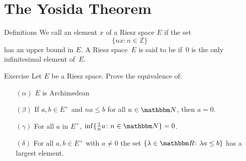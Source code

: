 \documentclass[main.tex]{subfiles}
\begin{document}
\section{The Yosida Theorem}
%
%
\begin{psec}{3.1}{Definitions}
We call an element $x$ 
of a Riesz space $E$
if the set
\begin{equation*}
\{ n x\colon n\in \mathbb Z \}
\end{equation*}
has an upper bound in $E$.
A Riesz space~$E$ is said to be
if~$0$ is the only infinitesimal element of~$E$.
\end{psec}
%
%
\begin{psec}{3.2}{Exercise}
Let $E$ be a Riesz space.
Prove the equivalence of:
\begin{enumerate}
\item[$(\alpha)$] \label{3.2-alpha}
$E$ is Archimedean
%
\item[$(\beta)$] \label{3.2-beta}
If $a,b\in E^+$ and $na\leq b$ for all $n\in \N$, then $a=0$.
%
\item[$(\gamma)$] \label{3.2-gamma}
For all $a$ in $E^+$, 
$\inf \{ \frac{1}{n} a\colon n\in\N \} = 0$.
%
\item[$(\delta)$] \label{3.2-delta}
For all $a,b\in E^+$ with $a\neq 0$ 
the set $\{ \lambda\in \R\colon \lambda a \leq b \}$
has a largest element.
\end{enumerate}
\end{psec}
%
%
\end{document}
